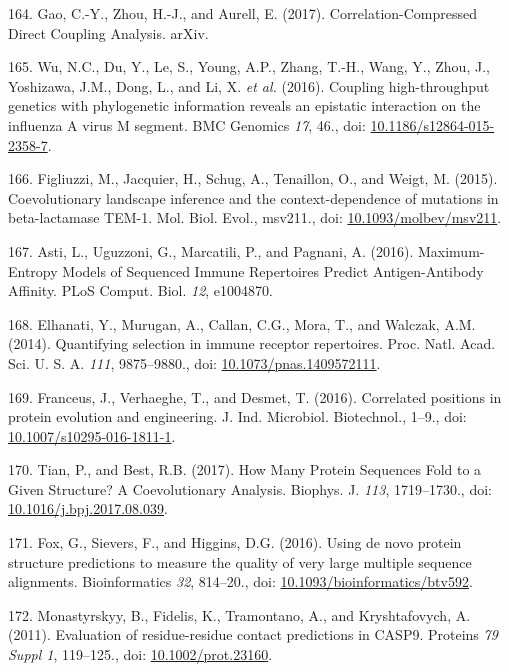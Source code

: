 \documentclass[11pt,a4paper,twoside]{book}
\theoremstyle{definition}
\theoremstyle{definition}
\theoremstyle{remark}
\begin{document}
\hypertarget{ref-Gao2017}{}
164. Gao, C.-Y., Zhou, H.-J., and Aurell, E. (2017).
Correlation-Compressed Direct Coupling Analysis. arXiv.

\hypertarget{ref-Wu2016}{}
165. Wu, N.C., Du, Y., Le, S., Young, A.P., Zhang, T.-H., Wang, Y.,
Zhou, J., Yoshizawa, J.M., Dong, L., and Li, X. \emph{et al.} (2016).
Coupling high-throughput genetics with phylogenetic information reveals
an epistatic interaction on the influenza A virus M segment. BMC
Genomics \emph{17}, 46., doi:
\href{https://doi.org/10.1186/s12864-015-2358-7}{10.1186/s12864-015-2358-7}.

\hypertarget{ref-Figliuzzi2015}{}
166. Figliuzzi, M., Jacquier, H., Schug, A., Tenaillon, O., and Weigt,
M. (2015). Coevolutionary landscape inference and the context-dependence
of mutations in beta-lactamase TEM-1. Mol. Biol. Evol., msv211., doi:
\href{https://doi.org/10.1093/molbev/msv211}{10.1093/molbev/msv211}.

\hypertarget{ref-Asti2016}{}
167. Asti, L., Uguzzoni, G., Marcatili, P., and Pagnani, A. (2016).
Maximum-Entropy Models of Sequenced Immune Repertoires Predict
Antigen-Antibody Affinity. PLoS Comput. Biol. \emph{12}, e1004870.

\hypertarget{ref-Elhanati2014}{}
168. Elhanati, Y., Murugan, A., Callan, C.G., Mora, T., and Walczak,
A.M. (2014). Quantifying selection in immune receptor repertoires. Proc.
Natl. Acad. Sci. U. S. A. \emph{111}, 9875--9880., doi:
\href{https://doi.org/10.1073/pnas.1409572111}{10.1073/pnas.1409572111}.

\hypertarget{ref-Franceus2016}{}
169. Franceus, J., Verhaeghe, T., and Desmet, T. (2016). Correlated
positions in protein evolution and engineering. J. Ind. Microbiol.
Biotechnol., 1--9., doi:
\href{https://doi.org/10.1007/s10295-016-1811-1}{10.1007/s10295-016-1811-1}.

\hypertarget{ref-Tian2017}{}
170. Tian, P., and Best, R.B. (2017). How Many Protein Sequences Fold to
a Given Structure? A Coevolutionary Analysis. Biophys. J. \emph{113},
1719--1730., doi:
\href{https://doi.org/10.1016/j.bpj.2017.08.039}{10.1016/j.bpj.2017.08.039}.

\hypertarget{ref-Fox2016}{}
171. Fox, G., Sievers, F., and Higgins, D.G. (2016). Using de novo
protein structure predictions to measure the quality of very large
multiple sequence alignments. Bioinformatics \emph{32}, 814--20., doi:
\href{https://doi.org/10.1093/bioinformatics/btv592}{10.1093/bioinformatics/btv592}.

\hypertarget{ref-Monastyrskyy2011}{}
172. Monastyrskyy, B., Fidelis, K., Tramontano, A., and Kryshtafovych,
A. (2011). Evaluation of residue-residue contact predictions in CASP9.
Proteins \emph{79 Suppl 1}, 119--125., doi:
\href{https://doi.org/10.1002/prot.23160}{10.1002/prot.23160}.
\end{document}
